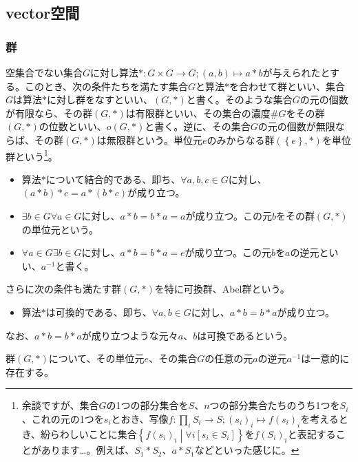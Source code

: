 \documentclass[dvipdfmx]{jsarticle}
\begin{document}
\subsection{vector空間}%
\subsubsection{群}%
\begin{axs}[群の公理]
空集合でない集合$G$に対し算法$*:G \times G \rightarrow G;(a,b) \mapsto a*b$が与えられたとする。このとき、次の条件たちを満たす集合$G$と算法$*$を合わせて群といい、集合$G$は算法$*$に対し群をなすといい、$(G,*)$と書く。そのような集合$G$の元の個数が有限なら、その群$(G,*)$は有限群といい、その集合の濃度$\#G$をその群$(G,*)$の位数といい、$o(G,*)$と書く。逆に、その集合$G$の元の個数が無限ならば、その群$(G,*)$は無限群という。単位元$e$のみからなる群$\left( \left\{ e \right\},* \right)$を単位群という\footnote{余談ですが、集合$G$の1つの部分集合を$S$、$n$つの部分集合たちのうち1つを$S_{i}$、これの元の1つを$s_{i}$とおき、写像$f:\prod_{i} S_{i} \rightarrow S;\left( s_{i} \right)_{i} \mapsto f\left( s_{i} \right)_{i}$を考えるとき、紛らわしいことに集合$\left\{ f\left( s_{i} \right)_{i} \middle| \forall i\left\lbrack s_{i} \in S_{i} \right\rbrack \right\}$を$f\left( S_{i} \right)_{i}$と表記することがあります…。例えば、$S_{1}*S_{2}$、$a*S_{1}$などといった感じに。}。
\begin{itemize}
\item
  算法$*$について結合的である、即ち、$\forall a,b,c \in G$に対し、$(a*b)*c = a*(b*c)$が成り立つ。
\item
  $\exists b \in G\forall a \in G$に対し、$a*b = b*a = a$が成り立つ。この元$b$をその群$(G,*)$の単位元という。
\item
  $\forall a \in G\exists b \in G$に対し、$a*b = b*a = e$が成り立つ。この元$b$を$a$の逆元といい、$a^{- 1}$と書く。
\end{itemize}
さらに次の条件も満たす群$(G,*)$を特に可換群、Abel群という。
\begin{itemize}
\item
  算法$*$は可換的である、即ち、$\forall a,b \in G$に対し、$a*b = b*a$が成り立つ。
\end{itemize}
なお、$a*b = b*a$が成り立つような元々$a$、$b$は可換であるという。
\end{axs}
\begin{thm}\label{2.1.1.1}
群$(G,*)$について、その単位元$e$、その集合$G$の任意の元$a$の逆元$a^{- 1}$は一意的に存在する。
\end{thm}\par
\end{document}
